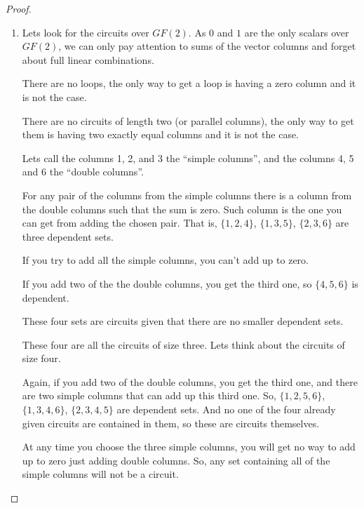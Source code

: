 \begin{proof}\label{t1:p1}
    \begin{enumerate}[label=(\roman*)]
        \item\label{t1:p1i}
            Lets look for the circuits over $GF(2)$. As $0$ and $1$ are the only scalars over $GF(2)$,
            we can only pay attention to sums of the vector columns and forget about full linear combinations.\pn
            
            There are no loops, the only way to get a loop is having a zero column and it is not the case.\pn
            
            There are no circuits of length two (or parallel columns), the only way to get them is having two 
            exactly equal columns and it is not the case.\pn
            
            Lets call the columns 1, 2, and 3 the ``simple columns'', and the columns 4, 5 and 6 the ``double columns''.\pn
            
            For any pair of the columns from the simple columns there is a column from the double columns 
            such that the sum is zero. Such column is the one you can get from adding the chosen pair. 
            That is, $\{1, 2, 4\}$, $\{1, 3, 5\}$, $\{2, 3, 6\}$ are three dependent sets.\pn
            
            If you try to add all the simple columns, you can't add up to zero.\pn
            
            If you add two of the the double columns, you get the third one, so $\{4, 5, 6\}$ is dependent.\pn
            
            These four sets are circuits given that there are no smaller dependent sets.\pn
            
            These four are all the circuits of size three. Lets think about the circuits of size four.\pn
            
            Again, if you add two of the double columns, you get the third one, and there are two simple columns that can
            add up this third one. So, $\{1, 2, 5, 6\}$, $\{1, 3, 4, 6\}$, $\{2, 3, 4, 5\}$ are dependent sets.
            And no one of the four already given circuits are contained in them, so these are circuits themselves.\pn
            
            At any time you choose the three simple columns, you will get no way to add up to zero just adding double columns.
            So, any set containing all of the simple columns will not be a circuit.\pn
            

\end{enumerate}
\end{proof}
